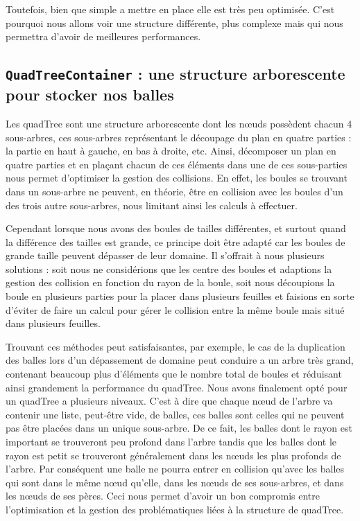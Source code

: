 \documentclass[a4paper]{scrartcl}
\begin{document}
Toutefois, bien que simple a mettre en place elle est très peu
optimisée. C'est pourquoi nous allons voir une structure différente,
plus complexe mais qui nous permettra d'avoir de meilleures
performances.


\subsection{\texttt{QuadTreeContainer} : une structure arborescente
  pour stocker nos balles}

Les quadTree sont une structure arborescente dont les nœuds possèdent
chacun 4 sous-arbres, ces sous-arbres représentant le découpage du
plan en quatre parties : la partie en haut à gauche, en bas à droite,
etc. Ainsi, décomposer un plan en quatre parties et en plaçant chacun
de ces éléments dans une de ces sous-parties nous permet d'optimiser
la gestion des collisions. En effet, les boules se trouvant dans un
sous-arbre ne peuvent, en théorie, être en collision avec les boules
d'un des trois autre sous-arbres, nous limitant ainsi les calculs à
effectuer.

Cependant lorsque nous avons des boules de tailles différentes, et
surtout quand la différence des tailles est grande, ce principe doit
être adapté car les boules de grande taille peuvent dépasser de leur
domaine. Il s'offrait à nous plusieurs solutions : soit nous ne
considérions que les centre des boules et adaptions la gestion des
collision en fonction du rayon de la boule, soit nous découpions la
boule en plusieurs parties pour la placer dans plusieurs feuilles et
faisions en sorte d'éviter de faire un calcul pour gérer le collision
entre la même boule mais situé dans plusieurs feuilles.

Trouvant ces méthodes peut satisfaisantes, par exemple, le cas de la
duplication des balles lors d'un dépassement de domaine peut conduire
a un arbre très grand, contenant beaucoup plus d'éléments que le
nombre total de boules et réduisant ainsi grandement la performance du
quadTree. Nous avons finalement opté pour un quadTree a plusieurs
niveaux. C'est à dire que chaque nœud de l'arbre va contenir une
liste, peut-être vide, de balles, ces balles sont celles qui ne
peuvent pas être placées dans un unique sous-arbre. De ce fait, les
balles dont le rayon est important se trouveront peu profond dans
l'arbre tandis que les balles dont le rayon est petit se trouveront
généralement dans les nœuds les plus profonds de l'arbre. Par
conséquent une balle ne pourra entrer en collision qu'avec les balles
qui sont dans le même nœud qu'elle, dans les nœuds de ses sous-arbres,
et dans les nœuds de ses pères. Ceci nous permet d'avoir un bon
compromis entre l'optimisation et la gestion des problématiques liées
à la structure de quadTree.
\end{document}
